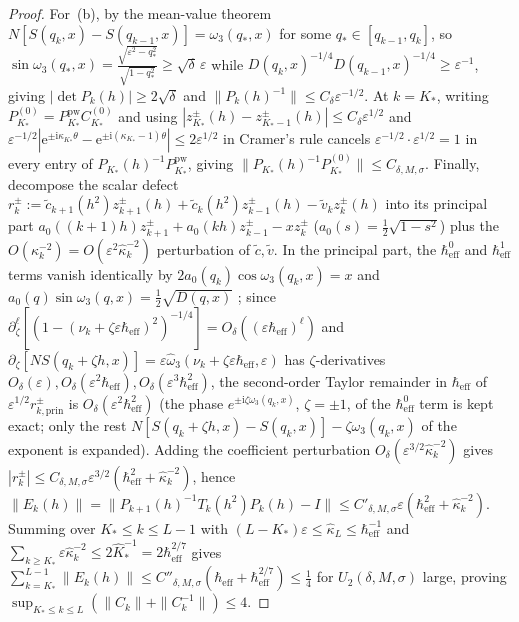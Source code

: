 \documentclass[11pt]{article}
\theoremstyle{definition}
\theoremstyle{remark}
\newcommand{\ii}{\mathrm{i}}
\newcommand{\heff}{\hbar_{\mathrm{eff}}}
\renewcommand{\_}{\oldunderscore\penalty0\hskip0pt\relax}
\begin{document}
\begin{proof}
For~(b), by the mean-value theorem $N[S(q_k,x)-S(q_{k-1},x)]=\omega_3(q_*,x)$ for some $q_*\in[q_{k-1},q_k]$, so
  $\sin\omega_3(q_*,x)=\frac{\sqrt{\varepsilon^2-q_*^2}}{\sqrt{1-q_*^2}}\ge\sqrt{\delta}\,\varepsilon$ while
  $D(q_k,x)^{-1/4}D(q_{k-1},x)^{-1/4}\ge\varepsilon^{-1}$, giving $|\det P_k(h)|\ge 2\sqrt{\delta}$ and $\|P_k(h)^{-1}\|\le
  C_\delta\varepsilon^{-1/2}$. At $k=K_*$, writing $P_{K_*}^{(0)}=P_{K_*}^{\mathrm{pw}}C_{K_*}^{(0)}$ and using
  $|z_{K_*}^\pm(h)-z_{K_*-1}^\pm(h)|\le C_\delta\varepsilon^{1/2}$ and
  $\varepsilon^{-1/2}|\mathrm{e}^{\pm\ii\kappa_{K_*}\theta}-\mathrm{e}^{\pm\ii(\kappa_{K_*}-1)\theta}|\le 2\varepsilon^{1/2}$ in
  Cramer's rule cancels $\varepsilon^{-1/2}\cdot\varepsilon^{1/2}=1$ in every entry of $P_{K_*}(h)^{-1}P_{K_*}^{\mathrm{pw}}$,
  giving $\|P_{K_*}(h)^{-1}P_{K_*}^{(0)}\|\le C_{\delta,M,\sigma}$. Finally, decompose the scalar defect
  $r_k^\pm:=\tilde{c}_{k+1}(h^2)z_{k+1}^\pm(h)+\tilde{c}_k(h^2)z_{k-1}^\pm(h)-\tilde{v}_k z_k^\pm(h)$ into its principal part
  $a_0((k+1)h)z_{k+1}^\pm+a_0(kh)z_{k-1}^\pm-x z_k^\pm$ ($a_0(s)=\frac12\sqrt{1-s^2}$) plus the
  $O(\kappa_k^{-2})=O(\varepsilon^2\hat{\kappa}_k^{-2})$ perturbation of $\tilde{c},\tilde{v}$. In the principal part, the
  $\heff^0$ and $\heff^1$ terms vanish identically by $2a_0(q_k)\cos\omega_3(q_k,x)=x$ and
  $a_0(q)\sin\omega_3(q,x)=\frac12\sqrt{D(q,x)}$ \cite[Eqs.~(183)--(184)]{LewisGrowingRank};
  since $\partial_\zeta^\ell[(1-(\nu_k+\zeta\varepsilon\heff)^2)^{-1/4}]=O_\delta((\varepsilon\heff)^\ell)$ and $\partial_\zeta[N
  S(q_k+\zeta h,x)]=\varepsilon\widehat{\omega}_3(\nu_k+\zeta\varepsilon\heff,\varepsilon)$ has $\zeta$-derivatives
  $O_\delta(\varepsilon),O_\delta(\varepsilon^2\heff),O_\delta(\varepsilon^3\heff^2)$, the second-order Taylor remainder in $\heff$ of
  $\varepsilon^{1/2}r_{k,\mathrm{prin}}^\pm$ is $O_\delta(\varepsilon^2\heff^2)$ (the phase $e^{\pm\ii\zeta\omega_3(q_k,x)}$, $\zeta=\pm1$, of the $\heff^0$ term is kept exact; only the rest $N[S(q_k+\zeta h,x)-S(q_k,x)]-\zeta\omega_3(q_k,x)$ of the exponent is expanded). Adding the coefficient perturbation
  $O_\delta(\varepsilon^{3/2}\hat{\kappa}_k^{-2})$ gives $|r_k^\pm|\le
  C_{\delta,M,\sigma}\varepsilon^{3/2}(\heff^2+\hat{\kappa}_k^{-2})$, hence $\|E_k(h)\|=\|P_{k+1}(h)^{-1}T_k(h^2)P_k(h)-I\|\le
  C'_{\delta,M,\sigma}\varepsilon(\heff^2+\hat{\kappa}_k^{-2})$. Summing over $K_*\le k\le L-1$ with
  $(L-K_*)\varepsilon\le\hat{\kappa}_L\le\heff^{-1}$ and $\sum_{k\ge K_*}\varepsilon\hat{\kappa}_k^{-2}\le
  2\hat{K}_*^{-1}=2\heff^{2/7}$ gives $\sum_{k=K_*}^{L-1}\|E_k(h)\|\le C''_{\delta,M,\sigma}(\heff+\heff^{2/7})\le\frac14$ for
  $U_2(\delta,M,\sigma)$ large, proving $\sup_{K_*\le k\le L}(\|C_k\|+\|C_k^{-1}\|)\le 4$.
\end{proof}
\end{document}

